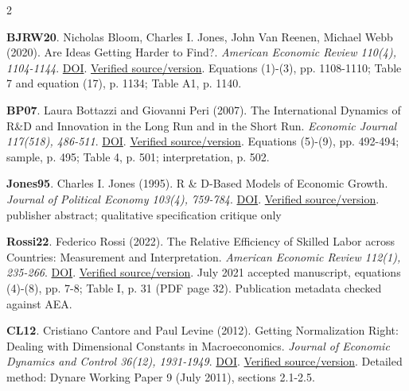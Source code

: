 \documentclass[10pt,a4paper,landscape]{article}
\begin{document}
\begin{multicols}{2}
\begin{minipage}{\linewidth}\hypertarget{ref:BJRW20}{}\textbf{BJRW20}. Nicholas Bloom, Charles I. Jones, John Van Reenen, Michael Webb (2020). Are Ideas Getting Harder to Find?. \emph{American Economic Review 110(4), 1104-1144}. \href{https://doi.org/10.1257/aer.20180338}{DOI}. \href{https://web.stanford.edu/~chadj/IdeaPF.pdf}{Verified source/version}. Equations (1)-(3), pp. 1108-1110; Table 7 and equation (17), p. 1134; Table A1, p. 1140.\end{minipage}\par
\begin{minipage}{\linewidth}\hypertarget{ref:BP07}{}\textbf{BP07}. Laura Bottazzi and Giovanni Peri (2007). The International Dynamics of R\&D and Innovation in the Long Run and in the Short Run. \emph{Economic Journal 117(518), 486-511}. \href{https://doi.org/10.1111/j.1468-0297.2007.02027.x}{DOI}. \href{https://giovanniperi.ucdavis.edu/uploads/5/6/8/2/56826033/bottazzi_et_al-2007-the_economic_journal.pdf}{Verified source/version}. Equations (5)-(9), pp. 492-494; sample, p. 495; Table 4, p. 501; interpretation, p. 502.\end{minipage}\par
\begin{minipage}{\linewidth}\hypertarget{ref:Jones95}{}\textbf{Jones95}. Charles I. Jones (1995). R \& D-Based Models of Economic Growth. \emph{Journal of Political Economy 103(4), 759-784}. \href{https://doi.org/10.1086/262002}{DOI}. \href{https://www.journals.uchicago.edu/doi/10.1086/262002}{Verified source/version}. publisher abstract; qualitative specification critique only\end{minipage}\par
\begin{minipage}{\linewidth}\hypertarget{ref:Rossi22}{}\textbf{Rossi22}. Federico Rossi (2022). The Relative Efficiency of Skilled Labor across Countries: Measurement and Interpretation. \emph{American Economic Review 112(1), 235-266}. \href{https://doi.org/10.1257/aer.20191852}{DOI}. \href{https://wrap.warwick.ac.uk/id/eprint/159013/1/WRAP-Relative-efficiency-skilled-labor-across-countries-measurement-interpretation-2021.pdf}{Verified source/version}. July 2021 accepted manuscript, equations (4)-(8), pp. 7-8; Table I, p. 31 (PDF page 32). Publication metadata checked against AEA.\end{minipage}\par
\begin{minipage}{\linewidth}\hypertarget{ref:CL12}{}\textbf{CL12}. Cristiano Cantore and Paul Levine (2012). Getting Normalization Right: Dealing with Dimensional Constants in Macroeconomics. \emph{Journal of Economic Dynamics and Control 36(12), 1931-1949}. \href{https://doi.org/10.1016/j.jedc.2012.05.009}{DOI}. \href{https://archives.dynare.org/wp-repo/dynarewp009.pdf}{Verified source/version}. Detailed method: Dynare Working Paper 9 (July 2011), sections 2.1-2.5.\end{minipage}\par

\end{multicols}
\end{document}
